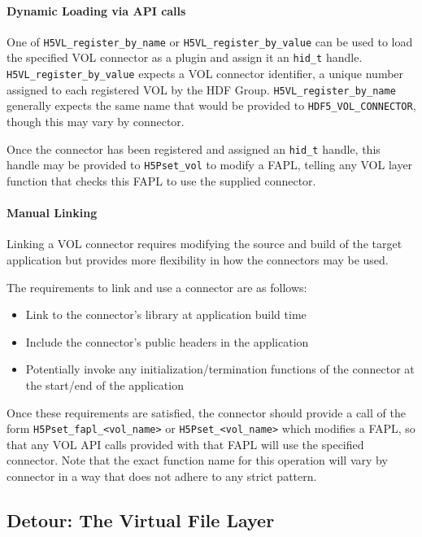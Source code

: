 \paragraph{Dynamic Loading via API calls}  One of \texttt{H5VL\_register\_by\_name} or \texttt{H5VL\_register\_by\_value} can be used to load the specified VOL connector as a plugin and assign it an \texttt{hid\_t} handle. \texttt{H5VL\_register\_by\_value} expects a VOL connector identifier, a unique number assigned to each registered VOL by the HDF Group. \texttt{H5VL\_register\_by\_name} generally expects the same name that would be provided to \texttt{HDF5\_VOL\_CONNECTOR}, though this may vary by connector. 

Once the connector has been registered and assigned an \texttt{hid\_t} handle, this handle may be provided to \texttt{H5Pset\_vol} to modify a FAPL, telling any VOL layer function that checks this FAPL to use the supplied connector.

\paragraph{Manual Linking} Linking a VOL connector requires modifying the source and build of the target application but provides more flexibility in how the connectors may be used. 

The requirements to link and use a connector are as follows:
\begin{itemize}
    \item Link to the connector's library at application build time
    \item Include the connector's public headers in the application
    \item Potentially invoke any initialization/termination functions of the connector at the start/end of the application
\end{itemize}

Once these requirements are satisfied, the connector should provide a call of the form \texttt{H5Pset\_fapl\_<vol\_name>} or \texttt{H5Pset\_<vol\_name>} which modifies a FAPL, so that any VOL API calls provided with that FAPL will use the specified connector. Note that the exact function name for this operation will vary by connector in a way that does not adhere to any strict pattern.

\subsection{Detour: The Virtual File Layer}\label{sec:vfl}


